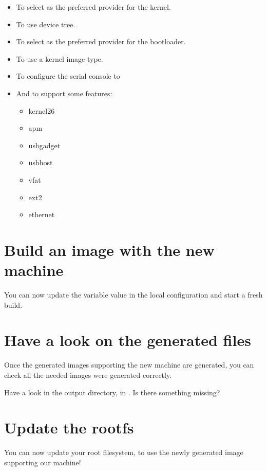\begin{itemize}
  \item To select  as the preferred provider
    for the kernel.
  \item To use  device tree.
  \item To select  as the preferred provider
    for the bootloader.
  \item To use a  kernel image type.
  \item To configure the serial console to 
  \item And to support some features:
    \begin{itemize}
      \item kernel26
      \item apm
      \item usbgadget
      \item usbhost
      \item vfat
      \item ext2
      \item ethernet
    \end{itemize}
\end{itemize}

\section{Build an image with the new machine}

You can now update the  variable value in the local configuration
and start a fresh build.

\section{Have a look on the generated files}

Once the generated images supporting the new  machine are
generated, you can check all the needed images were generated
correctly.

Have a look in the output directory, in
. Is there something
missing?

\section{Update the rootfs}

You can now update your root filesystem, to use the newly
generated image supporting our  machine!
